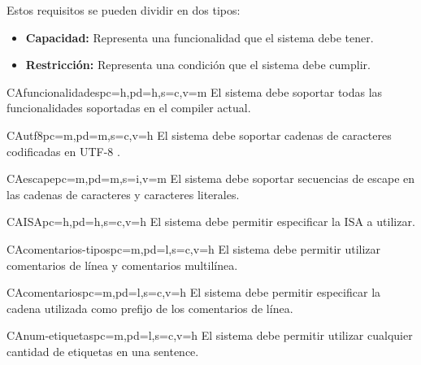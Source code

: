 \noindent
Estos requisitos se pueden dividir en dos tipos:

\begin{itemize}
    \item \textbf{Capacidad:} Representa una funcionalidad que el sistema debe tener.
    \item \textbf{Restricción:} Representa una condición que el sistema debe cumplir.
\end{itemize}

\printureqtemplate


\begin{userReq}{CA}{funcionalidades}{pc=h,pd=h,s=c,v=m}
    El sistema debe soportar todas las funcionalidades soportadas en el
    \gls{compiler} actual.
\end{userReq}

\begin{userReq}{CA}{utf8}{pc=m,pd=m,s=c,v=h}
    El sistema debe soportar cadenas de caracteres codificadas en UTF-8
    \parencite{UTF-8}.
\end{userReq}

\begin{userReq}{CA}{escape}{pc=m,pd=m,s=i,v=m}
    El sistema debe soportar secuencias de escape en las cadenas de caracteres y
    caracteres literales.
\end{userReq}

\begin{userReq}{CA}{ISA}{pc=h,pd=h,s=c,v=h}
    El sistema debe permitir especificar la \gls{ISA} a utilizar.
\end{userReq}

\begin{userReq}{CA}{comentarios-tipos}{pc=m,pd=l,s=c,v=h}
    El sistema debe permitir utilizar comentarios de línea y comentarios
    multilínea.
\end{userReq}

\begin{userReq}{CA}{comentarios}{pc=m,pd=l,s=c,v=h}
    El sistema debe permitir especificar la cadena utilizada como prefijo de los
    comentarios de línea.
\end{userReq}

\begin{userReq}{CA}{num-etiquetas}{pc=m,pd=l,s=c,v=h}
    El sistema debe permitir utilizar cualquier cantidad de etiquetas en una
    \gls{sentence}.
\end{userReq}

